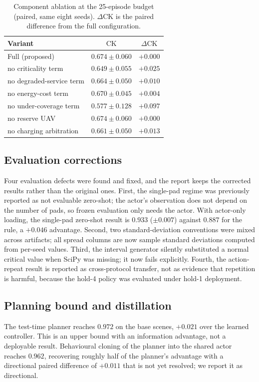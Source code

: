 \documentclass[conference]{IEEEtran}
\newcommand{\ck}{\mathrm{CK}}
\begin{document}
\begin{table}[t]
\caption{Component ablation at the 25-episode budget (paired, same eight seeds). $\Delta\ck$ is the paired difference from the full configuration.}
\label{tab:abl}
\centering
\small
\setlength{\tabcolsep}{3pt}
\begin{tabular}{@{}lcc@{}}
\toprule
Variant & $\ck$ & $\Delta\ck$ \\
\midrule
Full (proposed) & $0.674\pm0.060$ & $+0.000$ \\
no criticality term & $0.649\pm0.055$ & $+0.025$ \\
no degraded-service term & $0.664\pm0.050$ & $+0.010$ \\
no energy-cost term & $0.670\pm0.045$ & $+0.004$ \\
no under-coverage term & $0.577\pm0.128$ & $+0.097$ \\
no reserve UAV & $0.674\pm0.060$ & $+0.000$ \\
no charging arbitration & $0.661\pm0.050$ & $+0.013$ \\
\bottomrule
\end{tabular}
\end{table}

\subsection{Evaluation corrections}
Four evaluation defects were found and fixed, and the report keeps the corrected results rather than the original ones. First, the single-pad regime was previously reported as not evaluable zero-shot; the actor's observation does not depend on the number of pads, so frozen evaluation only needs the actor. With actor-only loading, the single-pad zero-shot result is $0.933$ ($\pm0.007$) against $0.887$ for the rule, a $+0.046$ advantage. Second, two standard-deviation conventions were mixed across artifacts; all spread columns are now sample standard deviations computed from per-seed values. Third, the interval generator silently substituted a normal critical value when SciPy was missing; it now fails explicitly. Fourth, the action-repeat result is reported as cross-protocol transfer, not as evidence that repetition is harmful, because the hold-4 policy was evaluated under hold-1 deployment.

\subsection{Planning bound and distillation}
The test-time planner reaches $0.972$ on the base scenes, $+0.021$ over the learned controller. This is an upper bound with an information advantage, not a deployable result. Behavioural cloning of the planner into the shared actor reaches $0.962$, recovering roughly half of the planner's advantage with a directional paired difference of $+0.011$ that is not yet resolved; we report it as directional.
\end{document}
